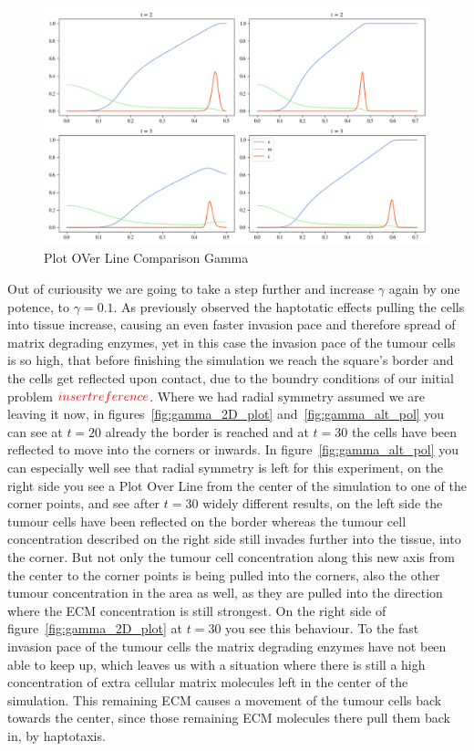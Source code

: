 \begin{figure}[h]
    \centering
    \includegraphics[width=\textwidth]{resources/images/gamma_pol_comparison.png}
    \caption{Plot OVer Line Comparison Gamma}
    \label{fig:gamma_pol_comparison}
\end{figure}
Out of curiousity we are going to take a step further and increase $\gamma$ again by one potence, to $\gamma=0.1$. As previously observed the haptotatic effects pulling the cells into tissue increase, causing an even faster invasion pace and therefore spread of matrix degrading enzymes, yet in this case the invasion pace of the tumour cells is so high, that before finishing the simulation we reach the square's border and the cells get reflected upon contact, due to the boundry conditions of our initial problem $\textcolor{red}{insertreference}$. Where we had radial symmetry assumed we are leaving it now, in figures~\ref{fig:gamma_2D_plot} and~\ref{fig:gamma_alt_pol} you can see at $t=20$ already the border is reached and at $t=30$ the cells have been reflected to move into the corners or inwards. In figure~\ref{fig:gamma_alt_pol} you can especially well see that radial symmetry is left for this experiment, on the right side you see a Plot Over Line from the center of the simulation to one of the corner points, and see after $t=30$ widely different results, on the left side the tumour cells have been reflected on the border whereas the tumour cell concentration described on the right side still invades further into the tissue, into the corner. But not only the tumour cell concentration along this new axis from the center to the corner points is being pulled into the corners, also the other tumour concentration in the area as well, as they are pulled into the direction where the ECM concentration is still strongest. On the right side of figure~\ref{fig:gamma_2D_plot} at $t=30$ you see this behaviour. To the fast invasion pace of the tumour cells the matrix degrading enzymes have not been able to keep up, which leaves us with a situation where there is still a high concentration of extra cellular matrix molecules left in the center of the simulation. This remaining ECM causes a movement of the tumour cells back towards the center, since those remaining ECM molecules there pull them back in, by haptotaxis.
